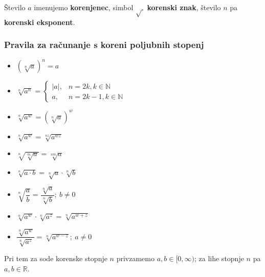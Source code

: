                 Število $a$ imenujemo \textbf{korenjenec}, simbol $\sqrt{~}$ \textbf{korenski znak}, število $n$ pa \textbf{korenski eksponent}.
            

        

         
                        
            \subsubsection*{Pravila za računanje s koreni poljubnih stopenj}
                \begin{multicols}{2}
                    \begin{itemize}
                        \item $\displaystyle \left(\sqrt[n]{a}\right)^n=a$ 
                        \item $\displaystyle \sqrt[n]{a^n}=\begin{cases}
                                \lvert a\rvert, & n=2k, k\in\mathbb{N} \\
                                a, & n=2k-1, k\in\mathbb{N}
                            \end{cases}$ ~
                        \item $\displaystyle \sqrt[n]{a^w}=\left(\sqrt[n]{a}\right)^w$ 
                        \item $\displaystyle \sqrt[n]{a^w}=\sqrt[nz]{a^{wz}}$ 
                        \item $\displaystyle \sqrt[n]{\sqrt[m]{a}}=\sqrt[nm]{a}$ 
                        \item $\displaystyle \sqrt[n]{a\cdot b}=\sqrt[n]{a}\cdot\sqrt[n]{b}$ 
                        \item $\displaystyle \sqrt[n]{\dfrac{a}{b}}=\dfrac{\sqrt[n]{a}}{\sqrt[n]{b}}; ~b\neq 0$ 
                        \item $\displaystyle \sqrt[n]{a^w}\cdot\sqrt[n]{a^z}=\sqrt[n]{a^{w+z}}$ 
                        \item $\displaystyle \dfrac{\sqrt[n]{a^w}}{\sqrt[n]{a^z}}=\sqrt[n]{a^{w-z}}; ~a\neq 0$
                    \end{itemize}

                \end{multicols}
                
                

                Pri tem za sode korenske stopnje $n$ privzamemo $a,b\in[0,\infty)$; za lihe stopnje $n$ pa $a,b\in\mathbb{R}$.
            

